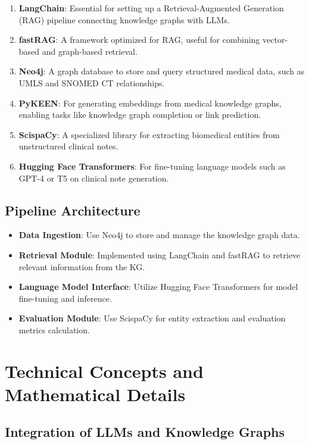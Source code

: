 \documentclass[12pt, a4paper]{article}
\begin{document}
\begin{enumerate}
    \item \textbf{LangChain}: Essential for setting up a Retrieval-Augmented Generation (RAG) pipeline connecting knowledge graphs with LLMs.
    \item \textbf{fastRAG}: A framework optimized for RAG, useful for combining vector-based and graph-based retrieval.
    \item \textbf{Neo4j}: A graph database to store and query structured medical data, such as UMLS and SNOMED CT relationships.
    \item \textbf{PyKEEN}: For generating embeddings from medical knowledge graphs, enabling tasks like knowledge graph completion or link prediction.
    \item \textbf{ScispaCy}: A specialized library for extracting biomedical entities from unstructured clinical notes.
    \item \textbf{Hugging Face Transformers}: For fine-tuning language models such as GPT-4 or T5 on clinical note generation.
\end{enumerate}

\subsection{Pipeline Architecture}

\begin{itemize}
    \item \textbf{Data Ingestion}: Use Neo4j to store and manage the knowledge graph data.
    \item \textbf{Retrieval Module}: Implemented using LangChain and fastRAG to retrieve relevant information from the KG.
    \item \textbf{Language Model Interface}: Utilize Hugging Face Transformers for model fine-tuning and inference.
    \item \textbf{Evaluation Module}: Use ScispaCy for entity extraction and evaluation metrics calculation.
\end{itemize}

\section{Technical Concepts and Mathematical Details}

\subsection{Integration of LLMs and Knowledge Graphs}
\end{document}

